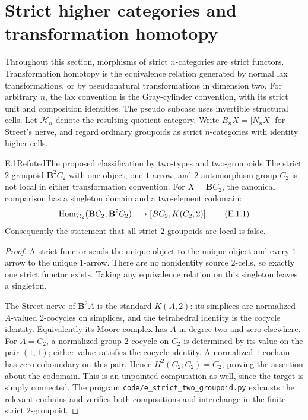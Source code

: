 \section{Strict higher categories and transformation homotopy}

Throughout this section, morphisms of strict $n$-categories are strict functors. Transformation homotopy is the equivalence relation generated by normal lax transformations, or by pseudonatural transformations in dimension two. For arbitrary $n$, the lax convention is the Gray-cylinder convention, with its strict unit and composition identities. The pseudo subcase uses invertible structural cells. Let $\mathcal H_n$ denote the resulting quotient category. Write $B_nX=|N_nX|$ for Street's nerve, and regard ordinary groupoids as strict $n$-categories with identity higher cells.

\begin{claim}{E.1}{Refuted}{The proposed classification by two-types and two-groupoids}
The strict $2$-groupoid $\mathbf B^2C_2$ with one object, one $1$-arrow, and $2$-automorphism group $C_2$ is not local in either transformation convention. For $X=\mathbf BC_2$, the canonical comparison has a singleton domain and a two-element codomain:
\[
 \operatorname{Hom}_{\mathcal H_2}(\mathbf BC_2,\mathbf B^2C_2)
 \longrightarrow [BC_2,K(C_2,2)]. \tag{E.1.1}
\]
Consequently the statement that all strict $2$-groupoids are local is false.
\end{claim}
\begin{proof}
A strict functor sends the unique object to the unique object and every $1$-arrow to the unique $1$-arrow. There are no nonidentity source $2$-cells, so exactly one strict functor exists. Taking any equivalence relation on this singleton leaves a singleton.

The Street nerve of $\mathbf B^2A$ is the standard $K(A,2)$: its simplices are normalized $A$-valued $2$-cocycles on simplices, and the tetrahedral identity is the cocycle identity. Equivalently its Moore complex has $A$ in degree two and zero elsewhere. For $A=C_2$, a normalized group $2$-cocycle on $C_2$ is determined by its value on the pair $(1,1)$; either value satisfies the cocycle identity. A normalized $1$-cochain has zero coboundary on this pair. Hence $H^2(C_2;C_2)=C_2$, proving the assertion about the codomain. This is an unpointed computation as well, since the target is simply connected. The program \texttt{code/e\_strict\_two\_groupoid.py} exhausts the relevant cochains and verifies both compositions and interchange in the finite strict $2$-groupoid.
\end{proof}

